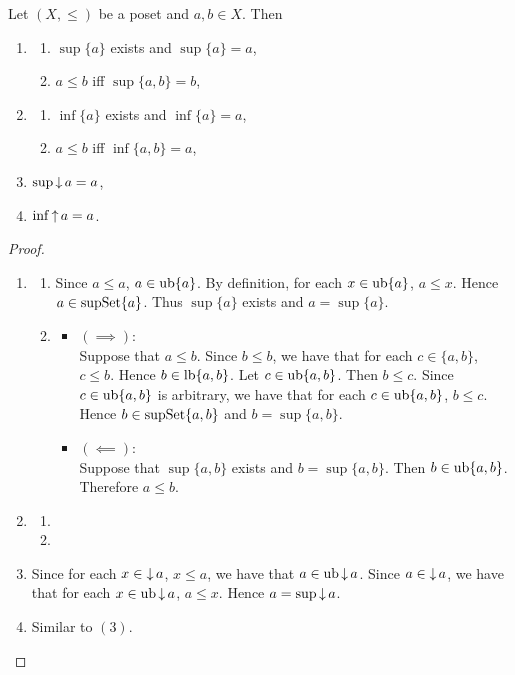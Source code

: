 \documentclass{book}
\begin{document}
	\begin{ex} 
		Let $(X, \leq)$ be a poset and $a,b \in X$. Then 
		\begin{enumerate}
			\item 
			\begin{enumerate}
				\item $\sup \{a\}$ exists and $\sup \{a\} = a$,
				\item $a \leq b$ iff $\sup \{a,b\} = b$,
			\end{enumerate}
			\item 
			\begin{enumerate}
				\item $\inf \{a\}$ exists and $\inf \{a\} = a$,
				\item $a \leq b$ iff $\inf \{a,b\} = a$,
			\end{enumerate}
			\item $\sup \operatorname{\downarrow} a = a$,
			\item $\inf \operatorname{\uparrow} a = a$.
		\end{enumerate}
	\end{ex}
	
	\begin{proof}\
		\begin{enumerate}
			\item 
			\begin{enumerate}
				\item Since $a \leq a$, $a \in \operatorname{ub}\{a\}$. By definition, for each $x \in \operatorname{ub} \{a\}$, $a \leq x$. Hence $a \in \operatorname{supSet} \{a\}$. Thus $\sup \{a\}$ exists and $a = \sup \{a\}$. 
				\item 
				\begin{itemize}
					\item $(\implies)$: \\
					Suppose that $a \leq b$. Since $b \leq b$, we have that for each $c \in \{a,b\}$, $c \leq b$. Hence $b \in \operatorname{lb} \{a,b\}$. Let $c \in \operatorname{ub} \{a,b\}$. Then $b \leq c$. Since $c \in \operatorname{ub} \{a,b\}$ is arbitrary, we have that for each $c \in \operatorname{ub} \{a, b\}$, $b \leq c$. Hence $b \in \operatorname{supSet} \{a,b\}$ and $b = \sup \{a,b\}$.
					\item $(\impliedby)$: \\
					Suppose that $\sup \{a,b\}$ exists and $b = \sup \{a,b\}$. Then $b \in \operatorname{ub} \{a,b\}$. Therefore $a \leq b$. 
				\end{itemize}
			\end{enumerate}
			\item 
			\begin{enumerate}
				\item {}
				\item {}
			\end{enumerate}
			\item Since for each $x \in \operatorname{\downarrow} a$, $x \leq a$, we have that $a \in \operatorname{ub} \operatorname{\downarrow} a$. Since $a \in \operatorname{\downarrow} a$, we have that for each $x \in \operatorname{ub} \operatorname{\downarrow} a$, $a \leq x$. Hence $a = \sup \operatorname{\downarrow} a$. 
			\item Similar to $(3)$.
		\end{enumerate}
	\end{proof}
	
\end{document}
